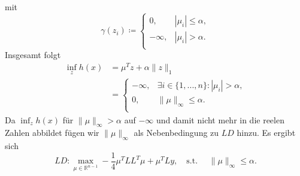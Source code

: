 \documentclass[ngerman, a4paper,12pt]{article}
\begin{document}
mit 
\begin{equation*}
\gamma(z_i) \coloneqq \begin{cases}
	0,& |\mu_i|\leq \alpha,\\
	-\infty,& |\mu_i|>\alpha.\\
\end{cases}
\end{equation*}
Insgesamt folgt 
\begin{equation*}
	\begin{split}
		\inf_z h(x) &=  \mu^Tz+\alpha\|z\|_1 \\
		&=\begin{cases}
		-\infty,&\exists i \in \{1,..., n\}:|\mu_i | >\alpha,\\
		0,&\|\mu\|_\infty\leq\alpha.\\
		\end{cases}
	\end{split}
\end{equation*}
Da $\inf_z h(x)$ für $\| \mu \|_{\infty} > \alpha $ auf $-\infty$ und damit nicht mehr in die reelen Zahlen abbildet fügen wir $\| \mu \|_{\infty}$ als Nebenbedingung zu $LD$ hinzu. Es ergibt sich
\begin{equation*}
  LD:  \max_{\mu \in \mathbb{R}^{n-1}} -\frac{1}{4}\mu^TLL^T\mu + \mu^TLy,\quad \text{s.t. } \quad \|\mu\|_\infty\leq\alpha.
\end{equation*}
\end{document}
